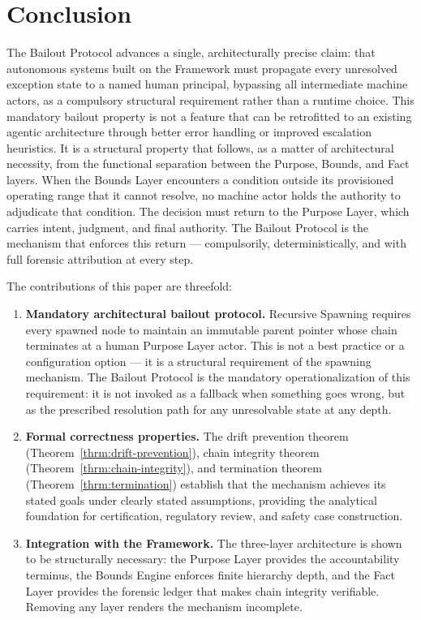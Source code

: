 \section{Conclusion}
\label{sec:conclusion}

The Bailout Protocol advances a single, architecturally precise claim: that autonomous systems built on the \bxthree{} Framework must propagate every unresolved exception state to a named human principal, bypassing all intermediate machine actors, as a compulsory structural requirement rather than a runtime choice. This mandatory bailout property is not a feature that can be retrofitted to an existing agentic architecture through better error handling or improved escalation heuristics. It is a structural property that follows, as a matter of architectural necessity, from the functional separation between the Purpose, Bounds, and Fact layers. When the Bounds Layer encounters a condition outside its provisioned operating range that it cannot resolve, no machine actor holds the authority to adjudicate that condition. The decision must return to the Purpose Layer, which carries intent, judgment, and final authority. The Bailout Protocol is the mechanism that enforces this return --- compulsorily, deterministically, and with full forensic attribution at every step.

The contributions of this paper are threefold:

\begin{enumerate}
    \itemsep0em
    \item \textbf{Mandatory architectural bailout protocol.} Recursive Spawning requires every spawned node to maintain an immutable parent pointer whose chain terminates at a human Purpose Layer actor. This is not a best practice or a configuration option --- it is a structural requirement of the spawning mechanism. The Bailout Protocol is the mandatory operationalization of this requirement: it is not invoked as a fallback when something goes wrong, but as the prescribed resolution path for any unresolvable state at any depth.

    \item \textbf{Formal correctness properties.} The drift prevention theorem (Theorem~\ref{thrm:drift-prevention}), chain integrity theorem (Theorem~\ref{thrm:chain-integrity}), and termination theorem (Theorem~\ref{thrm:termination}) establish that the mechanism achieves its stated goals under clearly stated assumptions, providing the analytical foundation for certification, regulatory review, and safety case construction.

    \item \textbf{Integration with the \bxthree{} Framework.} The three-layer architecture is shown to be structurally necessary: the Purpose Layer provides the accountability terminus, the Bounds Engine enforces finite hierarchy depth, and the Fact Layer provides the forensic ledger that makes chain integrity verifiable. Removing any layer renders the mechanism incomplete.
\end{enumerate}

